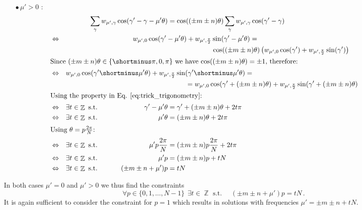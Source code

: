 \documentclass{article}
\newcommand{\lp}{\left(}
\newcommand{\rp}{\right)}
\DeclareMathOperator*{\Z}{\mathbb{Z}}
\begin{document}
\begin{itemize}
	\item[$\bullet\,\mu' > 0$]:
		\begin{align*}
			&				 & \span\span
				\sum_{\gamma} w_{\mu', \gamma} \cos(\gamma'-\gamma - \mu'\theta) &=
				\cos((\pm m \pm n) \theta) \sum_{\gamma} w_{\mu', \gamma} \cos(\gamma'-\gamma) \\
			&\Leftrightarrow & \span\span
				w_{\mu', 0} \cos(\gamma'- \mu'\theta) + w_{\mu', {\pi\over2}} \sin(\gamma'- \mu'\theta) = \qquad\qquad\qquad\qquad\qquad\qquad\qquad\qquad \span \\
			&& \span\span\span
				\qquad\qquad \cos((\pm m \pm n) \theta) \lp w_{\mu', 0} \cos(\gamma') + w_{\mu', {\pi\over2}} \sin(\gamma') \rp\\
			\intertext{Since $(\pm m \pm n) \theta \in \{\shortminus\pi, 0, \pi\}$ we have $\cos((\pm m \pm n)\theta) = \pm 1 $, therefore:}
			&\Leftrightarrow & \span\span
w_{\mu', 0} \cos(\gamma'  \shortminus   \mu'\theta) +w_{\mu', {\pi\over2}} \sin(\gamma' \shortminus \mu'\theta) = \qquad\qquad\qquad\qquad\qquad\qquad\qquad\qquad\qquad\qquad \span \\
			&& \span\span
				\span \qquad\qquad = w_{\mu', 0} \cos(\gamma'+ (\pm m  \pm  n) \theta) + w_{\mu', {\pi\over2}} \sin(\gamma' + (\pm m  \pm  n) \theta)\\
			\intertext{Using the property in Eq. \eqref{eq:trick_trigonometry}:}
			&\Leftrightarrow & \exists t \in \Z \text{ s.t. } \quad\quad &&
				\gamma' - \mu'\theta &= \gamma' + (\pm m \pm n)\theta +2t\pi\\
			&\Leftrightarrow & \exists t \in \Z \text{ s.t. } \quad\quad &&
				\mu'\theta &= (\pm m \pm n)\theta +2t\pi\\
			\intertext{Using $\theta = p {2\pi \over N}$:}
			&\Leftrightarrow & \exists t \in \Z \text{ s.t. } \quad\quad &&
				\mu'p {2\pi\over N} &= (\pm m \pm n)p {2\pi\over N} +2t\pi\\
			&\Leftrightarrow & \exists t \in \Z \text{ s.t. } \quad\quad &&
				\mu'p &= (\pm m \pm n)p + tN\\
			&\Leftrightarrow & \exists t \in \Z \text{ s.t. } \quad\quad &&
				(\pm m \pm n + \mu') p &= tN\\
\end{align*}
\end{itemize}
In both cases $\mu'=0$ and $\mu'>0$ we thus find the constraints
\[
	\forall p\in\{0, 1, \dots, N-1\}\ \ \exists t \in \Z \text{ s.t. } \quad (\pm m\pm n+\mu') p = tN \,.
\]
It is again sufficient to consider the constraint for $p=1$ which results in solutions with frequencies $\mu'=\pm m\pm n+tN$.
\end{document}
